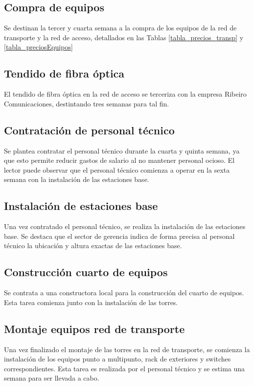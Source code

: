 \documentclass[12pt,a4paper]{book}
\begin{document}
\subsection{Compra de equipos}
Se destinan la tercer y cuarta semana a la compra de los equipos de la red de transporte y la red de acceso, detallados en las Tablas \ref{tabla_precios_transp} y \ref{tabla_preciosEquipos}

\subsection{Tendido de fibra óptica}
El tendido de fibra óptica en la red de acceso se terceriza con la empresa Ribeiro Comunicaciones, destintando tres semanas para tal fin.

\subsection{Contratación de personal técnico}
Se plantea contratar el personal técnico durante la cuarta y quinta semana, ya que esto permite reducir gastos de salario al no mantener personal ocioso. El lector puede observar que el personal técnico comienza a operar en la sexta semana con la instalación de las estaciones base.

\subsection{Instalación de estaciones base}
Una vez contratado el personal técnico, se realiza la instalación de las estaciones base. Se destaca que el sector de gerencia indica de forma precisa al personal técnico la ubicación y altura exactas de las estaciones base.

\subsection{Construcción cuarto de equipos}
Se contrata a una constructora local para la construcción del cuarto de equipos. Esta tarea comienza junto con la instalación de las torres.

\subsection{Montaje equipos red de transporte}
Una vez finalizado el montaje de las torres en la red de transporte, se comienza la instalación de los equipos punto a multipunto, rack de exteriores y switches correspondientes. Esta tarea es realizada por el personal técnico y se estima una semana para ser llevada a cabo.
\end{document}
